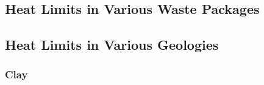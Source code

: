 \subsection{Heat Limits in Various Waste Packages}



\subsection{Heat Limits in Various Geologies}

\subsubsection{Clay}
% 


